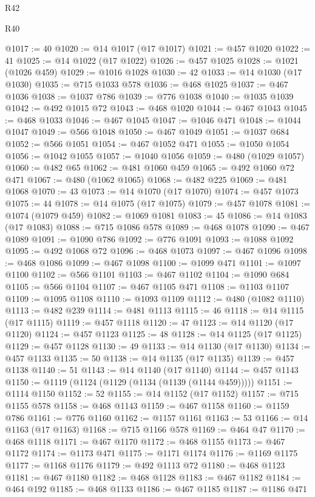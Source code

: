 \begin{lexlean}{R42}
\begin{lexlean}{R40}
\begin{coremodule}
{{{{{{{{{{{{{{{{{{{{{{{{{{{{{{{{{{{{{{{{{{{{{{{{{{{{{{{{{{{{{{{{{{{{{{{{{{{{{{{{{{{{{{{{{{{{{{{{{{{{{{{{{{{{{@1017 := 40
@1020 := @14 @1017 (@17 @1017)
@1021 := @457 @1020
@1022 := 41
@1025 := @14 @1022 (@17 @1022)
@1026 := @457 @1025
@1028 := @1021 (@1026 @459)
@1029 := @1016 @1028
@1030 := 42
@1033 := @14 @1030 (@17 @1030)
@1035 := @715 @1033 @578
@1036 := @468 @1025
@1037 := @467 @1036
@1038 := @1037 @786
@1039 := @776 @1038
@1040 := @1035 @1039
@1042 := @492 @1015 @72
@1043 := @468 @1020
@1044 := @467 @1043
@1045 := @468 @1033
@1046 := @467 @1045
@1047 := @1046 @471
@1048 := @1044 @1047
@1049 := @566 @1048
@1050 := @467 @1049
@1051 := @1037 @684
@1052 := @566 @1051
@1054 := @467 @1052 @471
@1055 := @1050 @1054
@1056 := @1042 @1055
@1057 := @1040 @1056
@1059 := @480 (@1029 @1057)
@1060 := @482 @65
@1062 := @481 @1060 @459
@1065 := @492 @1060 @72 @471
@1067 := @480 (@1062 @1065)
@1068 := @482 @225
@1069 := @481 @1068
@1070 := 43
@1073 := @14 @1070 (@17 @1070)
@1074 := @457 @1073
@1075 := 44
@1078 := @14 @1075 (@17 @1075)
@1079 := @457 @1078
@1081 := @1074 (@1079 @459)
@1082 := @1069 @1081
@1083 := 45
@1086 := @14 @1083 (@17 @1083)
@1088 := @715 @1086 @578
@1089 := @468 @1078
@1090 := @467 @1089
@1091 := @1090 @786
@1092 := @776 @1091
@1093 := @1088 @1092
@1095 := @492 @1068 @72
@1096 := @468 @1073
@1097 := @467 @1096
@1098 := @468 @1086
@1099 := @467 @1098
@1100 := @1099 @471
@1101 := @1097 @1100
@1102 := @566 @1101
@1103 := @467 @1102
@1104 := @1090 @684
@1105 := @566 @1104
@1107 := @467 @1105 @471
@1108 := @1103 @1107
@1109 := @1095 @1108
@1110 := @1093 @1109
@1112 := @480 (@1082 @1110)
@1113 := @482 @239
@1114 := @481 @1113
@1115 := 46
@1118 := @14 @1115 (@17 @1115)
@1119 := @457 @1118
@1120 := 47
@1123 := @14 @1120 (@17 @1120)
@1124 := @457 @1123
@1125 := 48
@1128 := @14 @1125 (@17 @1125)
@1129 := @457 @1128
@1130 := 49
@1133 := @14 @1130 (@17 @1130)
@1134 := @457 @1133
@1135 := 50
@1138 := @14 @1135 (@17 @1135)
@1139 := @457 @1138
@1140 := 51
@1143 := @14 @1140 (@17 @1140)
@1144 := @457 @1143
@1150 := @1119 (@1124 (@1129 (@1134 (@1139 (@1144 @459)))))
@1151 := @1114 @1150
@1152 := 52
@1155 := @14 @1152 (@17 @1152)
@1157 := @715 @1155 @578
@1158 := @468 @1143
@1159 := @467 @1158
@1160 := @1159 @786
@1161 := @776 @1160
@1162 := @1157 @1161
@1163 := 53
@1166 := @14 @1163 (@17 @1163)
@1168 := @715 @1166 @578
@1169 := @464 @47
@1170 := @468 @1118
@1171 := @467 @1170
@1172 := @468 @1155
@1173 := @467 @1172
@1174 := @1173 @471
@1175 := @1171 @1174
@1176 := @1169 @1175
@1177 := @1168 @1176
@1179 := @492 @1113 @72
@1180 := @468 @1123
@1181 := @467 @1180
@1182 := @468 @1128
@1183 := @467 @1182
@1184 := @464 @192
@1185 := @468 @1133
@1186 := @467 @1185
@1187 := @1186 @471
}}}}}}}}}}}}}}}}}}}}}}}}}}}}}}}}}}}}}}}}}}}}}}}}}}}}}}}}}}}}}}}}}}}}}}}}}}}}}}}}}}}}}}}}}}}}}}}}}}}}}}}}}}}}}
\end{coremodule}
\end{lexlean}
\end{lexlean}
